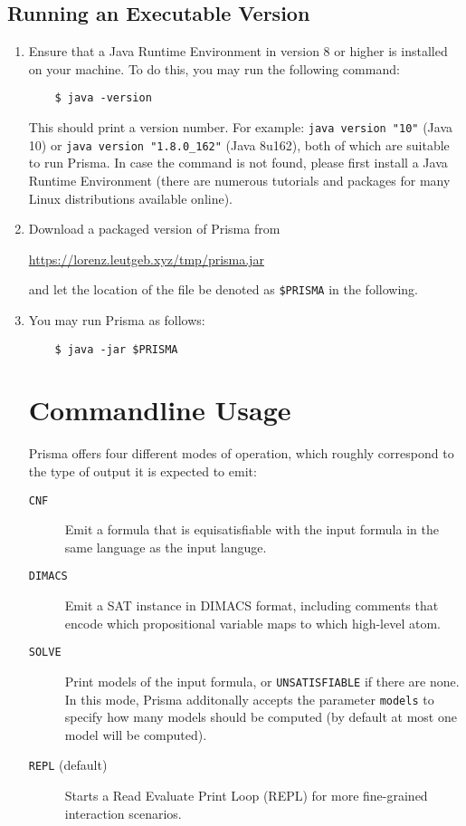 \documentclass{llncs}
\begin{document}
\subsection{Running an Executable Version}
\begin{enumerate}
	\item{Ensure that a Java Runtime Environment in version 8 or higher is installed on your machine. To do this, you may run the following command:
	\begin{verbatim}
	$ java -version
	\end{verbatim}
	This should print a version number. For example: \texttt{java~version~"10"} (Java 10) or \texttt{java~version~"1.8.0\_162"} (Java 8u162), both of which are suitable to run Prisma. In case the command is not found, please first install a Java Runtime Environment (there are numerous tutorials and packages for many Linux distributions available online).
	}
	\item{Download a packaged version of Prisma from
	\begin{center}
	\url{https://lorenz.leutgeb.xyz/tmp/prisma.jar}
	\end{center} and let the location of the file be denoted as \texttt{\$PRISMA} in the following.}
	\item{You may run Prisma as follows:
	\begin{verbatim}
	$ java -jar $PRISMA
	\end{verbatim}
	}

\section{Commandline Usage}

Prisma offers four different modes of operation, which roughly correspond to the type of output it is expected to emit:

\begin{description}
	\item[\texttt{CNF}]{Emit a formula that is equisatisfiable with the input formula in the same language as the input languge.}
	\item[\texttt{DIMACS}]{Emit a SAT instance in DIMACS format, including comments that encode which propositional variable maps to which high-level atom.}
	\item[\texttt{SOLVE}]{Print models of the input formula, or \texttt{UNSATISFIABLE} if there are none. In this mode, Prisma additonally accepts the parameter \texttt{models} to specify how many models should be computed (by default at most one model will be computed).}
	\item[\texttt{REPL} \textnormal{(default)}]{Starts a Read Evaluate Print Loop (REPL) for more fine-grained interaction scenarios.}
\end{description}


\end{enumerate}
\end{document}
